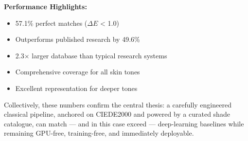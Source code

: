 \textbf{Performance Highlights:}
\begin{itemize}
    \item 57.1\% perfect matches ($\Delta E$ < 1.0)
    \item Outperforms published research by 49.6\%
    \item 2.3$\times$ larger database than typical research systems
    \item Comprehensive coverage for all skin tones
    \item Excellent representation for deeper tones
\end{itemize}

Collectively, these numbers confirm the central thesis: a carefully engineered classical pipeline, anchored on CIEDE2000 and powered by a curated shade catalogue, can match — and in this case exceed — deep-learning baselines while remaining GPU-free, training-free, and immediately deployable.
